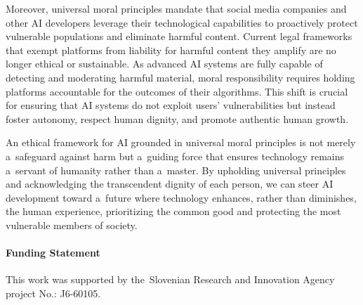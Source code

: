 \documentclass[%
  manuscript=article,
  year=2024,
  volume=77,
  doi=00000.000,
]{zfn}
\begin{document}
Moreover, universal moral principles mandate that social media companies and other AI developers leverage their technological capabilities to proactively protect vulnerable populations and eliminate harmful content. Current legal frameworks that exempt platforms from liability for harmful content they amplify are no longer ethical or sustainable. As advanced AI systems are fully capable of detecting and moderating harmful material, moral responsibility requires holding platforms accountable for the outcomes of their algorithms. This shift is crucial for ensuring that AI systems do not exploit users' vulnerabilities but instead foster autonomy, respect human dignity, and promote authentic human growth.



An ethical framework for AI grounded in universal moral principles is not merely a~safeguard against harm but a~guiding force that ensures technology remains a~servant of humanity rather than a~master. By upholding universal principles and acknowledging the transcendent dignity of each person, we can steer AI development toward a~future where technology enhances, rather than diminishes, the human experience, prioritizing the common good and protecting the most vulnerable members of society.




\paragraph{Funding Statement}
This work was supported by the~Slovenian Research and Innovation Agency project No.: J6-60105.


\printbibliography
\end{document}
